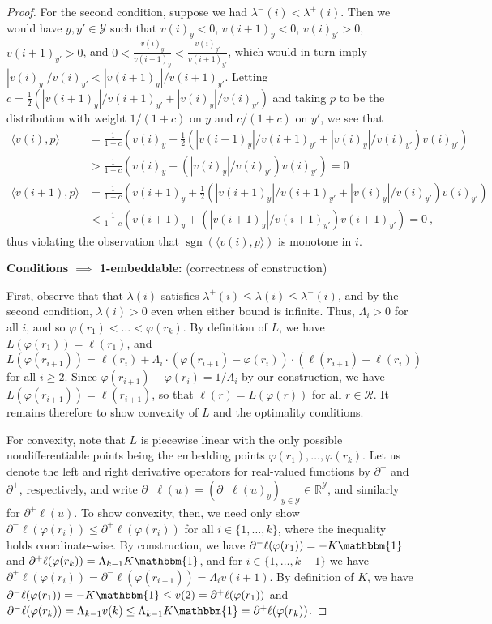 \documentclass[final]{colt2020} %
\newcommand{\reals}{\mathbb{R}}
\newcommand{\R}{\mathcal{R}}
\newcommand{\Y}{\mathcal{Y}}
\newcommand{\inprod}[2]{\langle #1, #2 \rangle}%
\newcommand{\ones}{\mathbbm{1}}
\DeclareMathOperator*{\sgn}{sgn}
\begin{document}
\begin{proof}
  For the second condition, suppose we had $\lambda^-(i) < \lambda^+(i)$.
  Then we would have $y,y' \in \Y$ such that $v(i)_y < 0$, $v({i+1})_y < 0$, $v(i)_{y'} >0$, $v({i+1})_{y'} > 0$, and $0 < \frac{v(i)_y}{v({i+1})_y} < \frac{v(i)_{y'}}{v({i+1})_{y'}}$, which would in turn imply $|v(i)_y|/v(i)_{y'} < |v(i+1)_y| / v(i+1)_{y'}$.
  Letting $c = \tfrac 1 2 \left(|v(i+1)_y| / v(i+1)_{y'} + |v(i)_y|/v(i)_{y'}\right)$ and taking $p$ to be the distribution with weight $1/(1+c)$ on $y$ and $c/(1+c)$ on $y'$, we see that
  \begin{align*}
    \inprod{v(i)}{p} &= \frac 1 {1+c} \left(v(i)_y + \tfrac 1 2 (|v(i+1)_y| / v(i+1)_{y'} + |v(i)_y|/v(i)_{y'})v(i)_{y'}\right)
    \\ &> \frac 1 {1+c} \left(v(i)_y + (|v(i)_y|/v(i)_{y'})v(i)_{y'}\right) = 0
    \\
    \inprod{v(i+1)}{p} &= \frac 1 {1+c} \left(v(i+1)_y + \tfrac 1 2 (|v(i+1)_y| / v(i+1)_{y'} + |v(i)_y|/v(i)_{y'})v(i)_{y'}\right)
    \\ &< \frac 1 {1+c} \left(v(i+1)_y + (|v(i+1)_y|/v(i+1)_{y'})v(i+1)_{y'}\right) = 0~,
  \end{align*}
  thus violating the observation that $\sgn(\inprod{v(i)}{p})$ is monotone in $i$.

  \noindent\textbf{Conditions $\implies$ 1-embeddable:} (correctness of construction)

  First, observe that that $\lambda(i)$ satisfies $\lambda^+(i) \leq \lambda(i) \leq \lambda^-(i)$, and by the second condition, $\lambda(i) > 0$ even when either bound is infinite.
  Thus, $\Lambda_i > 0$ for all $i$, and so $\varphi(r_1) < \ldots < \varphi(r_k)$.
  By definition of $L$, we have $L(\varphi(r_1)) = \ell(r_1)$, and $L(\varphi(r_{i+1})) = \ell(r_i) + \Lambda_i \cdot (\varphi(r_{i+1})-\varphi(r_i)) \cdot (\ell(r_{i+1}) - \ell(r_i))$ for all $i \geq 2$.
  Since $\varphi(r_{i+1})-\varphi(r_i) = 1/\Lambda_i$ by our construction, we have $L(\varphi(r_{i+1})) = \ell(r_{i+1})$, so that $\ell(r) = L(\varphi(r))$ for all $r\in\R$.
  It remains therefore to show convexity of $L$ and the optimality conditions.

  For convexity, note that $L$ is piecewise linear with the only possible nondifferentiable points being the embedding points $\varphi(r_1),\ldots,\varphi(r_k)$.
  Let us denote the left and right derivative operators for real-valued functions by $\partial^-$ and $\partial^+$, respectively, and write $\partial^- \ell(u) = (\partial^- \ell(u)_y)_{y\in\Y} \in \reals^\Y$, and similarly for $\partial^+\ell(u)$.
  To show convexity, then, we need only show $\partial^-\ell(\varphi(r_i)) \leq \partial^+\ell(\varphi(r_i))$ for all $i\in\{1,\ldots,k\}$, where the inequality holds coordinate-wise.
  By construction, we have $\partial^-\ell(\varphi(r_1)) = -K\ones$ and $\partial^+\ell(\varphi(r_k)) = \Lambda_{k-1} K\ones$, and for $i\in\{1,\ldots,k-1\}$ we have $\partial^+\ell(\varphi(r_i)) = \partial^-\ell(\varphi(r_{i+1})) = \Lambda_i v(i+1)$.
  By definition of $K$, we have $\partial^-\ell(\varphi(r_1)) = -K \ones \leq v(2) = \partial^+\ell(\varphi(r_1))$ and $\partial^-\ell(\varphi(r_k)) = \Lambda_{k-1} v(k) \leq \Lambda_{k-1} K \ones = \partial^+\ell(\varphi(r_k))$.


\end{proof}
\end{document}

